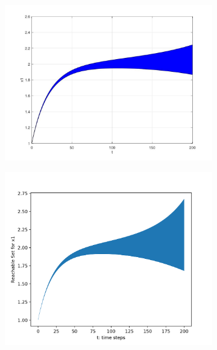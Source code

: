 \documentclass[EPiC]{easychair}
\begin{document}
\begin{figure}[h]

    \begin{subfigure}{0.5\textwidth}
    \centering
    \includegraphics[width=\textwidth]{SapoFigures/Phos/SapoPhos_X1.jpg}
    \end{subfigure}
    \begin{subfigure}{0.6\textwidth}
    \centering
    \includegraphics[width=\textwidth]{SapoFigures/Phos/KaaPhos_X1.png}
    \end{subfigure}
    

\end{figure}
\end{document}
